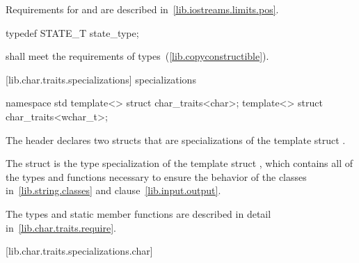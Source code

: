 \begin{itemdescr}
\pnum
\requires
Requirements for
and
are described in~\ref{lib.iostreams.limits.pos}.
\end{itemdescr}

%
%
\begin{itemdecl}
typedef STATE_T state_type;
\end{itemdecl}

\begin{itemdescr}
\pnum
\requires
{}
shall meet the requirements of
 types~(\ref{lib.copyconstructible}).
\end{itemdescr}

[lib.char.traits.specializations]{ specializations}

%
\begin{codeblock}
namespace std {
  template<> struct char_traits<char>;
  template<> struct char_traits<wchar_t>;
}
\end{codeblock}

\pnum
The header
declares two structs that are specializations of the template struct
.

\pnum
The struct  is the  type specialization
of the template struct , which contains all of the types
and functions necessary to ensure the behavior of the classes
in~\ref{lib.string.classes} and clause~\ref{lib.input.output}.

\pnum
The types and static member functions are described in detail
in~\ref{lib.char.traits.require}.

[lib.char.traits.specializations.char]{}

